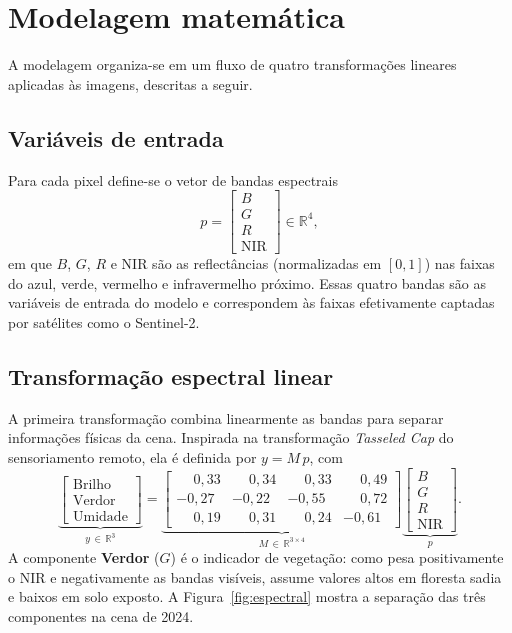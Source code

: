 \documentclass[12pt,a4paper,oneside]{article}
\begin{document}
\section{Modelagem matemática}\label{sec:modelagem}
A modelagem organiza-se em um fluxo de quatro transformações lineares
aplicadas às imagens, descritas a seguir.

\subsection{Variáveis de entrada}
Para cada pixel define-se o vetor de bandas espectrais
\begin{equation}
p = \begin{bmatrix} B \\ G \\ R \\ \mathrm{NIR} \end{bmatrix} \in \mathbb{R}^{4},
\end{equation}
em que $B$, $G$, $R$ e $\mathrm{NIR}$ são as reflectâncias (normalizadas em
$[0,1]$) nas faixas do azul, verde, vermelho e infravermelho próximo. Essas
quatro bandas são as variáveis de entrada do modelo e correspondem às faixas
efetivamente captadas por satélites como o Sentinel-2.

\subsection{Transformação espectral linear}
A primeira transformação combina linearmente as bandas para separar
informações físicas da cena. Inspirada na transformação \emph{Tasseled Cap} do
sensoriamento remoto, ela é definida por $y = M\,p$, com
\begin{equation}
\underbrace{\begin{bmatrix} \text{Brilho}\\ \text{Verdor}\\ \text{Umidade}\end{bmatrix}}_{y\,\in\,\mathbb{R}^3}
=
\underbrace{\begin{bmatrix}
\phantom{-}0{,}33 & \phantom{-}0{,}34 & \phantom{-}0{,}33 & \phantom{-}0{,}49\\
-0{,}27 & -0{,}22 & -0{,}55 & \phantom{-}0{,}72\\
\phantom{-}0{,}19 & \phantom{-}0{,}31 & \phantom{-}0{,}24 & -0{,}61
\end{bmatrix}}_{M\,\in\,\mathbb{R}^{3\times 4}}
\underbrace{\begin{bmatrix} B\\ G\\ R\\ \mathrm{NIR}\end{bmatrix}}_{p}.
\end{equation}
A componente \textbf{Verdor} ($G$) é o indicador de vegetação: como pesa
positivamente o NIR e negativamente as bandas visíveis, assume valores altos
em floresta sadia e baixos em solo exposto. A Figura~\ref{fig:espectral}
mostra a separação das três componentes na cena de 2024.
\end{document}
